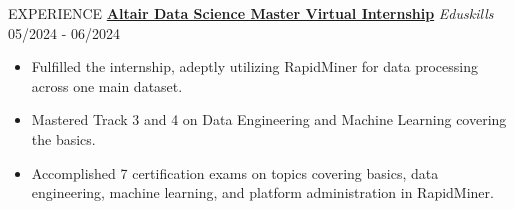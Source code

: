 \documentclass{resume} %
\begin{document}
\begin{rSection}{EXPERIENCE}
\textbf{\href{https://drive.google.com/drive/folders/1zJUxf5e83R8e-LNZSDJIef5HuBml4bJN?usp=drive_link}{Altair Data Science Master Virtual Internship}} \textit{Eduskills} \hfill 05/2024 - 06/2024 
\vspace{-0.6em}
\begin{itemize}
    \setlength\itemsep{-0.6em} %
    \item Fulfilled the internship, adeptly utilizing RapidMiner for data processing across one main dataset.
    \item Mastered Track 3 and 4 on Data Engineering and Machine Learning covering the basics.
    \item Accomplished 7 certification exams on topics covering basics, data engineering, machine learning, and platform administration in RapidMiner.
\end{itemize}

\end{rSection}
\end{document}
